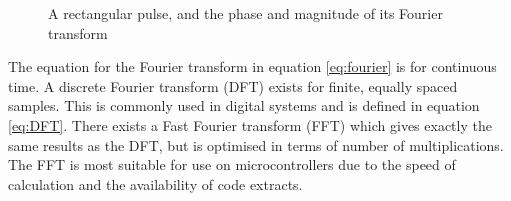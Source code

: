 \begin{figure}
\centering
{}
\caption{A rectangular pulse, and the phase and magnitude of its Fourier transform}
\label{fig:SquareWaveFT}
\end{figure}

The equation for the Fourier transform in equation \eqref{eq:fourier} is for continuous time. A discrete Fourier transform (DFT) exists for finite, equally spaced samples. This is commonly used in digital systems and is defined in equation \eqref{eq:DFT}. There exists a Fast Fourier transform (FFT) which gives exactly the same results as the DFT, but is optimised in terms of number of multiplications. The FFT is most suitable for use on microcontrollers due to the speed of calculation and the availability of code extracts. %

